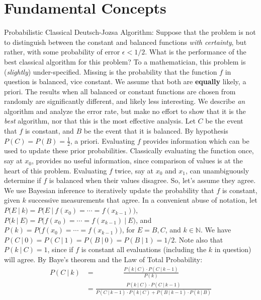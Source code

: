 
\chapter{Fundamental Concepts}
{}
 Probabilistic Classical Deutsch-Jozsa Algorithm: Suppose that the problem is not to distinguish between the constant and balanced functions \textit{with certainty}, but rather, with some probability of error $\epsilon < 1/2$.  What is the performance of the best classical algorithm for this problem?
\Soln  To a mathematician, this problem is (\textit{slightly}) under-specified.  Missing is the probability that the function $f$ in question is balanced, vice constant.  We assume that both are \textbf{equally} likely, a priori.  The results when all balanced or constant functions are chosen from randomly are significantly different, and likely less interesting.
We describe \textit{an} algorithm and analyze the error rate, but make no effort to show that it is the \textit{best} algorithm, nor that this is the most effective analysis. Let $C$ be the event that $f$ is constant, and $B$ be the event that it is balanced.  By hypothesis $P(C)=P(B)=\frac12$, a  priori.  Evaluating $f$ provides information which can be used to update these prior probabilities.  Classically evaluating the function once, say at $x_0$, provides no useful information, since comparison of values is at the heart of this problem.  Evaluating $f$ twice, say at $x_0$ and $x_1$, can unambiguously determine if $f$ is balanced when their values disagree.  So, let's assume they agree.  We use Bayesian inference to iteratively update the probability that $f$ is constant, given $k$ successive measurements that agree.  In a convenient abuse of notation, let $P(E\ |\ k) = P\bigl(E\ |\ f(x_0) = \cdots = f(x_{k-1})\bigr)$, $P(k\ |\ E) = P\bigl(f(x_0) = \cdots = f(x_{k-1})\ |\ E\bigr)$, and $P(k) =  P\bigl(f(x_0) = \cdots = f(x_{k-1})\bigr)$, for $E=B,C$, and $k\in\mathbb{N}$.  We have $P(C\ |\ 0)=P(C\ |\ 1)=P(B\ |\ 0)=P(B\ |\ 1) = 1/2$.  Note also that $P(k\ |\ C) = 1$, since if $f$ is constant all evaluations (including the $k$ in question) will agree.
By Baye's theorem and the Law of Total Probability:
\begin{align*}
P(C\ |\  k)&=\ \ \ \ \ \ \ \ \ \ \ \ \ \ \ \ \ \ \frac{P(k\ |\  C)\cdot P(C\ |\ k-1)}{P(k)} \\
&=\frac{P(k\ |\ C)\cdot P(C\ |\ k-1)}{ P(C\ |\ k-1) \cdot P(k\ |\ C) +  P(B\ |\ k-1) \cdot P(k\ |\ B)}
\end{align*}

